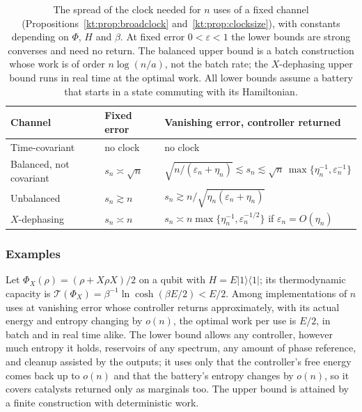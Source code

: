 \begin{table}[ht]
\centering
\small
\begin{tabular}{p{3.0cm}p{2.6cm}p{8.4cm}}
\toprule
Channel & Fixed error & Vanishing error, controller returned\\
\midrule
Time-covariant & no clock & no clock\\
Balanced, not covariant & $s_n\asymp\sqrt n$ & $\sqrt{n/(\varepsilon_n+\eta_n)}\lesssim s_n\lesssim\sqrt n\,\max\{\eta_n^{-1},\varepsilon_n^{-1}\}$\\
Unbalanced & $s_n\gtrsim n$ & $s_n\gtrsim n/\sqrt{\eta_n(\varepsilon_n+\eta_n)}$\\
\quad $X$-dephasing & $s_n\asymp n$ & $s_n\asymp n\max\{\eta_n^{-1},\varepsilon_n^{-1/2}\}$ if $\varepsilon_n=O(\eta_n)$\\
\bottomrule
\end{tabular}
\caption{The spread of the clock needed for $n$ uses of a fixed channel (Propositions~\ref{kt:prop:broadclock} and~\ref{kt:prop:clocksize}), with constants depending on $\Phi$, $H$ and $\beta$. At fixed error $0<\varepsilon<1$ the lower bounds are strong converses and need no return. The balanced upper bound is a batch construction whose work is of order $n\log(n/a)$, not the batch rate; the $X$-dephasing upper bound runs in real time at the optimal work. All lower bounds assume a battery that starts in a state commuting with its Hamiltonian.}\label{kt:tab:clocksize}
\end{table}

\subsubsection{Examples}

\begin{theorem}\label{kt:thm:batch}
Let $\Phi_X(\rho)=(\rho+X\rho X)/2$ on a qubit with $H=E|1\rangle\langle1|$; its thermodynamic capacity is $\mathcal T(\Phi_X)=\beta^{-1}\ln\cosh(\beta E/2)<E/2$. Among implementations of $n$ uses at vanishing error whose controller returns approximately, with its actual energy and entropy changing by $o(n)$, the optimal work per use is $E/2$, in batch and in real time alike. The lower bound allows any controller, however much entropy it holds, reservoirs of any spectrum, any amount of phase reference, and cleanup assisted by the outputs; it uses only that the controller's free energy comes back up to $o(n)$ and that the battery's entropy changes by $o(n)$, so it covers catalysts returned only as marginals too. The upper bound is attained by a finite construction with deterministic work.
\end{theorem}

